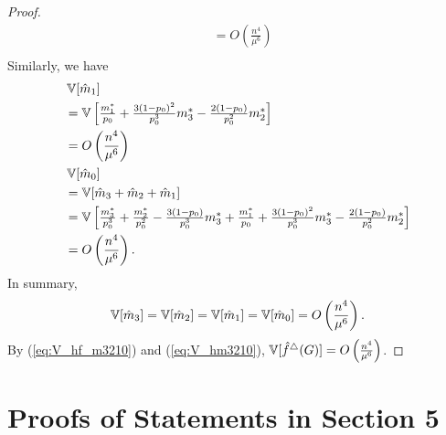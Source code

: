 \begin{proof}
\begin{align*}
    &= O\left(\frac{n^4}{\mu^6}\right) \\
\end{align*}
Similarly, we have
\begin{align*}
    &\operatorname{\mathbb{V}}[\hat{m}_1] \\
    &= \textstyle{\operatorname{\mathbb{V}}\left[\frac{m_1^*}{p_0} + \frac{3(1-p_0)^2}{p_0^3}m_3^* - \frac{2(1-p_0)}{p_0^2}m_2^* \right]} \\
    &= O\left(\frac{n^4}{\mu^6}\right) \\
    &\operatorname{\mathbb{V}}[\hat{m}_0] \\
    &= \operatorname{\mathbb{V}}[\hat{m}_3 + \hat{m}_2 + \hat{m}_1]\\
    &=
    \textstyle{\operatorname{\mathbb{V}}\left[\frac{m_3^*}{p_0^3}
    + \frac{m_2^*}{p_0^2} - \frac{3(1-p_0)}{p_0^3}m_3^*
    + \frac{m_1^*}{p_0} + \frac{3(1-p_0)^2}{p_0^3}m_3^* - \frac{2(1-p_0)}{p_0^2}m_2^*
     \right]} \\
    &= O\left(\frac{n^4}{\mu^6}\right).
\end{align*}
In summary,
\begin{align}
    \operatorname{\mathbb{V}}[\hat{m}_3] = \operatorname{\mathbb{V}}[\hat{m}_2] = \operatorname{\mathbb{V}}[\hat{m}_1] = \operatorname{\mathbb{V}}[\hat{m}_0] = O\left(\frac{n^4}{\mu^6}\right).
    \label{eq:V_hm3210}
\end{align}
By (\ref{eq:V_hf_m3210}) and (\ref{eq:V_hm3210}),
$\operatorname{\mathbb{V}}[\hat{f}^\triangle(G)] = O\left(\frac{n^4}{\mu^6}\right)$.
\end{proof}

\section{Proofs of Statements in Section 5}
\label{sec:triangle_proof}

